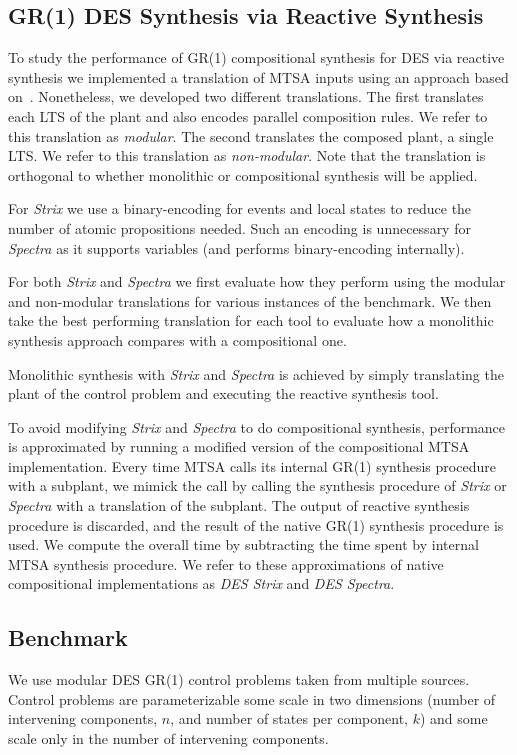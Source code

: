 \subsection{GR(1) DES Synthesis via Reactive Synthesis} 
To study the performance of GR(1) compositional synthesis for DES via reactive synthesis we implemented a translation of MTSA inputs using an approach based on~\cite{majumdar_supervisory_2021}. 
Nonetheless, we developed two different translations.  The first translates each LTS of the plant and also encodes parallel composition rules. We refer to this translation as \textit{modular}.
The second translates the composed plant, a single LTS. We refer to this translation as \textit{non-modular}. Note that the translation is orthogonal to whether monolithic or compositional synthesis will be applied.


For \textit{Strix} we use a binary-encoding for events and local states to reduce the number of atomic propositions needed. Such an encoding is unnecessary for \textit{Spectra} as it supports variables (and performs binary-encoding internally). 

For both \textit{Strix} and \textit{Spectra} we first evaluate how they perform using the modular and non-modular translations for various instances of the benchmark. We then take the best performing translation for each tool to evaluate how a monolithic synthesis approach compares with a compositional one. 

Monolithic synthesis with \textit{Strix} and \textit{Spectra} is achieved by simply translating the plant of the control problem and executing the reactive synthesis tool. 

To avoid modifying \textit{Strix} and \textit{Spectra} to do compositional synthesis, performance is approximated by running a modified version of the compositional MTSA implementation. Every time MTSA calls its internal GR(1) synthesis procedure with a subplant, we mimick the call by calling the synthesis procedure of \textit{Strix} or \textit{Spectra} with a translation of the subplant. The output of reactive synthesis procedure is discarded, and the result of the native GR(1) synthesis procedure is used. We compute the overall time by subtracting the time spent by internal MTSA synthesis procedure. We refer to these approximations of native compositional implementations as \textit{DES Strix} and \textit{DES Spectra}.



\subsection{Benchmark}
 We use modular DES GR(1) control problems taken from multiple sources. Control problems are parameterizable some scale in two dimensions (number of intervening components, $n$, and number of states per component, $k$) and some scale only in the number of intervening components.

